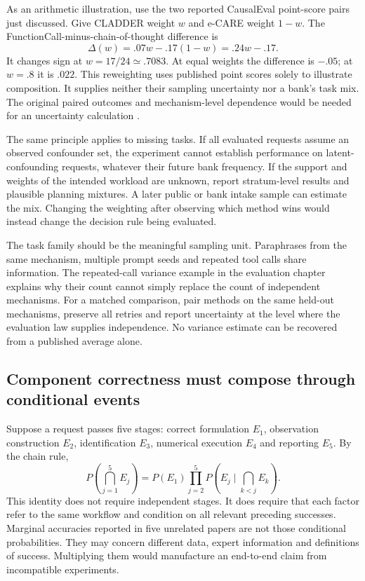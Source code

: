 As an arithmetic illustration, use the two reported CausalEval point-score
pairs just discussed. Give CLADDER weight $w$ and e-CARE weight $1-w$. The
FunctionCall-minus-chain-of-thought difference is
\begin{equation}
 \Delta(w)=.07w-.17(1-w)=.24w-.17.
 \label{exec13:frontier-rank}
\end{equation}
It changes sign at $w=17/24\simeq.7083$. At equal weights the difference is
$-.05$; at $w=.8$ it is $.022$. This reweighting uses published point scores
solely to illustrate composition. It supplies neither their sampling
uncertainty nor a bank's task mix. The original paired outcomes and
mechanism-level dependence would be needed for an uncertainty calculation
\citep{exec13_census_causaleval,exec13_frontier_exact}.

The same principle applies to missing tasks. If all evaluated requests assume
an observed confounder set, the experiment cannot establish performance on
latent-confounding requests, whatever their future bank frequency. If the
support and weights of the intended workload are unknown, report stratum-level
results and plausible planning mixtures. A later public or bank intake sample
can estimate the mix. Changing the weighting after observing which method wins
would instead change the decision rule being evaluated.

The task family should be the meaningful sampling unit. Paraphrases from the
same mechanism, multiple prompt seeds and repeated tool calls share information.
The repeated-call variance example in the evaluation chapter explains why
their count cannot simply replace the count of independent mechanisms. For a
matched comparison, pair methods on the same held-out mechanisms, preserve all
retries and report uncertainty at the level where the evaluation law supplies
independence. No variance estimate can be recovered from a published average
alone.

\subsection{Component correctness must compose through conditional events}

Suppose a request passes five stages: correct formulation $E_1$, observation
construction $E_2$, identification $E_3$, numerical execution $E_4$ and
reporting $E_5$. By the chain rule,
\begin{equation}
 P\!\left(\bigcap_{j=1}^5 E_j\right)
 =P(E_1)\prod_{j=2}^5P\!\left(E_j\mid\bigcap_{k<j}E_k\right).
 \label{exec13:frontier-chain}
\end{equation}
This identity does not require independent stages. It does require that each
factor refer to the same workflow and condition on all relevant preceding
successes. Marginal accuracies reported in five unrelated papers are not those
conditional probabilities. They may concern different data, expert information
and definitions of success. Multiplying them would manufacture an end-to-end
claim from incompatible experiments.

